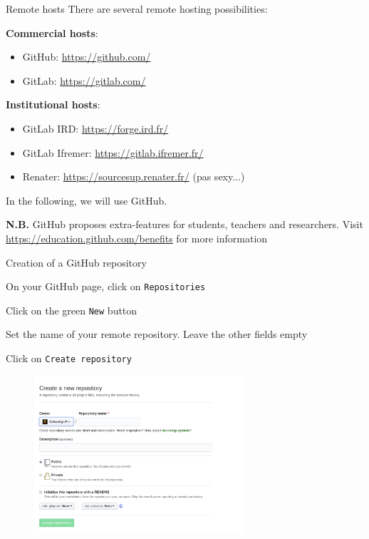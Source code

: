 \documentclass[10pt]{beamer}
\begin{document}
\begin{frame}{Remote hosts}
\protect\hypertarget{remote-hosts}{}
There are several remote hosting possibilities:

\textbf{Commercial hosts}:

\begin{itemize}
\item
  GitHub: \url{https://github.com/}
\item
  GitLab: \url{https://gitlab.com/}
\end{itemize}

\textbf{Institutional hosts}:

\begin{itemize}
\item
  GitLab IRD: \url{https://forge.ird.fr/}
\item
  GitLab Ifremer: \url{https://gitlab.ifremer.fr/}
\item{Renater: \url{https://sourcesup.renater.fr/} (pas sexy...)}
\end{itemize}

In the following, we will use GitHub.



\textbf{N.B. }GitHub proposes extra-features for students, teachers and researchers.
Visit \url{https://education.github.com/benefits} for more information

\end{frame}

\begin{frame}[fragile]{Creation of a GitHub repository}
\protect\hypertarget{creation-of-a-github-repository}{}

On your GitHub page, click on \texttt{Repositories}

Click on the green \texttt{New} button

Set the name of your remote repository. Leave the other fields empty

Click on \texttt{Create\ repository}


\begin{figure}

{\centering \includegraphics[width=0.7\textwidth]{img/github_makeRepo.png}

}

\end{figure}

\end{frame}
\end{document}
